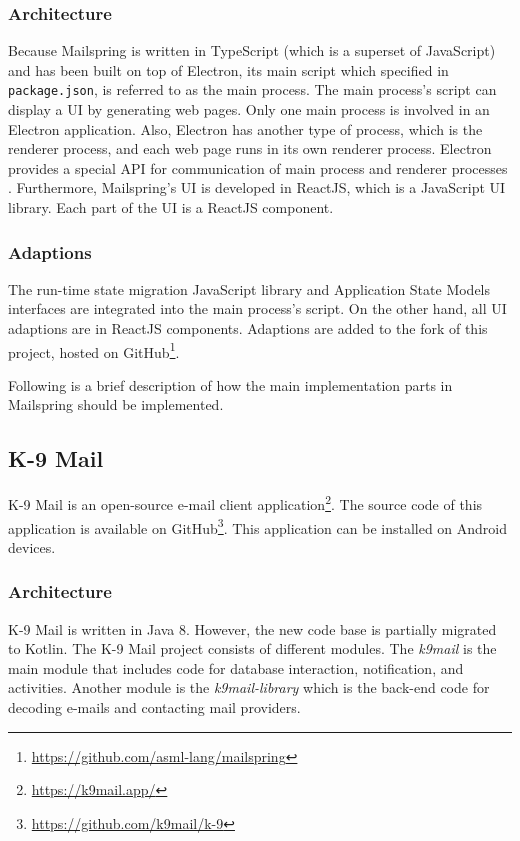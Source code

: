 \subsubsection{Architecture}
Because Mailspring is written in TypeScript (which is a superset of JavaScript) and has been built on top of Electron, its main script which specified in \lstinline[basicstyle=\ttfamily]{package.json}, is referred to as the main process. The main process's script can display a UI by generating web pages. Only one main process is involved in an Electron application. Also, Electron has another type of process, which is the renderer process, and each web page runs in its own renderer process. Electron provides a special API for communication of main process and renderer processes \cite{electron}. Furthermore, Mailspring's UI is developed in ReactJS, which is a JavaScript UI library. Each part of the UI is a ReactJS component.

\subsubsection{Adaptions}
The run-time state migration JavaScript library and Application State Models interfaces are integrated into the main process's script. On the other hand, all UI adaptions are in ReactJS components. Adaptions are added to the fork of this project, hosted on GitHub\footnote{\url{https://github.com/asml-lang/mailspring}}. 

Following is a brief description of how the main implementation parts in Mailspring should be implemented.



\subsection{K-9 Mail}
K-9 Mail is an open-source e-mail client application\footnote{\url{https://k9mail.app/}}. The source code of this application is available on GitHub\footnote{\url{https://github.com/k9mail/k-9}}. This application can be installed on Android devices.

\subsubsection{Architecture}
K-9 Mail is written in Java 8. However, the new code base is partially migrated to Kotlin. The K-9 Mail project consists of different modules. The \textit{k9mail} is the main module that includes code for database interaction, notification, and activities. Another module is the \textit{k9mail-library} which is the back-end code for decoding e-mails and contacting mail providers. 

